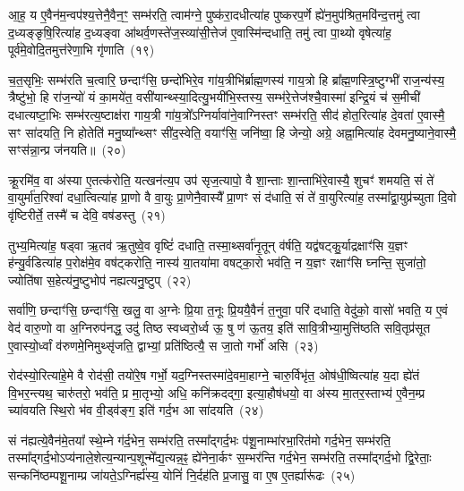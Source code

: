 आ॒ह॒ य ए॒वैन॑म॒न्वप॑श्य॒त्तेनै॒वैन॒ꣳ॒ सम्भ॑रति॒ त्वाम॑ग्ने॒ पुष्क॑रा॒दधीत्या॑ह पुष्करप॒र्णे ह्ये॑न॒मुप॑श्रित॒मवि॑न्द॒त्तमु॑ त्वा द॒ध्यङ्ङृषि॒रित्या॑ह द॒ध्यङ्वा आ॑थर्व॒णस्ते॑ज॒स्व्या॑सी॒त्तेज॑ ए॒वास्मि॑न्दधाति॒ तमु॑ त्वा पा॒थ्यो वृषेत्या॑ह॒ पूर्व॑मे॒वोदि॒तमुत्त॑रेणा॒भि गृ॑णाति~(१९)

च॒त॒सृभिः॒ सम्भ॑रति च॒त्वारि॒ छन्दाꣳ॑सि॒ छन्दो॑भिरे॒व गा॑य॒त्रीभि॑र्ब्राह्म॒णस्य॑ गाय॒त्रो हि ब्रा᳚ह्म॒णस्त्रि॒॒ष्टुग्भी॑ राज॒न्य॑स्य॒ त्रैष्टु॑भो॒ हि रा॑ज॒न्यो॑ यं का॒मये॑त॒ वसी॑यान्थ्स्या॒दित्यु॒भयी॑भि॒स्तस्य॒ सम्भ॑रे॒त्तेज॑श्चै॒वास्मा॑ इन्द्रि॒यं च॑ स॒मीची॑ दधात्यष्टा॒भिः सम्भ॑रत्य॒ष्टाक्ष॑रा गाय॒त्री गा॑य॒त्रो᳚\-ऽग्निर्यावा॑ने॒वाग्निस्तꣳ सम्भ॑रति॒ सीद॑ होत॒रित्या॑ह दे॒वता॑ ए॒वास्मै॒ सꣳ सा॑दयति॒ नि होतेति॑ मनु॒ष्या᳚न्थ्सꣳ सी॑द॒स्वेति॒ वयाꣳ॑सि॒ जनि॑ष्वा॒ हि जेन्यो॒ अग्रे॒ अह्ना॒मित्या॑ह देवमनु॒ष्याने॒वास्मै॒ सꣳस॑न्ना॒न्प्र ज॑नयति॥~(२०)

{\anuvakamend[{ऐव प॒शूनिति॑ गृणाति होत॒रिति॑ स॒प्तविꣳ॑शतिश्च}]}%

क्रू॒रमि॑व॒ वा अ॑स्या ए॒तत्क॑रोति॒ यत्खन॑त्य॒प उप॑ सृज॒त्यापो॒ वै शा॒न्ताः शा॒न्ताभि॑रे॒वास्यै॒ शुचꣳ॑ शमयति॒ सं ते॑ वा॒युर्मा॑त॒रिश्वा॑ दधा॒त्वित्या॑ह प्रा॒णो वै वा॒युः प्रा॒णेनै॒वास्यै᳚ प्रा॒णꣳ सं द॑धाति॒ सं ते॑ वा॒युरित्या॑ह॒ तस्मा᳚द्वा॒युप्र॑च्युता दि॒वो वृ॑ष्टिरीर्ते॒ तस्मै॑ च देवि॒ वष॑डस्तु~(२१)

तुभ्य॒मित्या॑ह॒ षड्वा ऋ॒तव॑ ऋ॒तुष्वे॒व वृष्टिं॑ दधाति॒ तस्मा॒थ्सर्वा॑नृ॒तून् व॑र्\mbox{}षति॒ यद्व॑षट्कु॒र्याद्रक्षाꣳ॑सि य॒ज्ञꣳ ह॑न्यु॒र्वडित्या॑ह प॒रोक्ष॑मे॒व वष॑ट्करोति॒ नास्य॑ या॒तया॑मा वषट्का॒रो भव॑ति॒ न य॒ज्ञꣳ रक्षाꣳ॑सि घ्नन्ति॒ सुजा॑तो॒ ज्योति॑षा स॒हेत्य॑नु॒ष्टुभोप॑ नह्यत्यनु॒ष्टुप्~(२२)

सर्वा॑णि॒ छन्दाꣳ॑सि॒ छन्दाꣳ॑सि॒ खलु॒ वा अ॒ग्नेः प्रि॒या त॒नूः प्रि॒ययै॒वैनं॑ त॒नुवा॒ परि॑ दधाति॒ वेदु॑को॒ वासो॑ भवति॒ य ए॒वं वेद॑ वारु॒णो वा अ॒ग्निरुप॑नद्ध॒ उदु॑ तिष्ठ स्वध्वरो॒र्ध्व ऊ॒ षु ण॑ ऊ॒तय॒ इति॑ सावि॒त्रीभ्या॒मुत्ति॑ष्ठति सवि॒तृप्र॑सूत ए॒वास्यो॒र्ध्वां व॑रुणमे॒निमुथ्सृ॑जति॒ द्वाभ्यां॒ प्रति॑ष्ठित्यै॒ स जा॒तो गर्भो॑ असि~(२३)

रोद॑स्यो॒रित्या॑हे॒मे वै रोद॑सी॒ तयो॑रे॒ष गर्भो॒ यद॒ग्निस्तस्मा॑दे॒वमा॒हाग्ने॒ चारु॒र्विभृ॑त॒ ओष॑धी॒ष्वित्या॑ह य॒दा ह्ये॑तं वि॒भर॒न्त्यथ॒ चारु॑तरो॒ भव॑ति॒ प्र मा॒तृभ्यो॒ अधि॒ कनि॑क्रदद्गा॒ इत्या॒हौष॑धयो॒ वा अ॑स्य मा॒तर॒स्ताभ्य॑ ए॒वैन॒म्प्र च्या॑वयति स्थि॒रो भ॑व वी॒ड्व॑ङ्ग॒ इति॑ गर्द॒भ आ सा॑दयति~(२४)

सं न॑ह्यत्ये॒वैन॑मे॒तया᳚ स्थे॒म्ने ग॑र्द॒भेन॒ सम्भ॑रति॒ तस्मा᳚द्गर्द॒भः प॑शू॒नाम्भा॑रभा॒रित॑मो गर्द॒भेन॒ सम्भ॑रति॒ तस्मा᳚द्गर्द॒भो\-ऽप्य॑नाले॒शेत्य॒न्यान्प॒शून्मे᳚द्य॒त्यन्न॒ꣴ॒ ह्ये॑नेना॒र्कꣳ स॒म्भर॑न्ति गर्द॒भेन॒ सम्भ॑रति॒ तस्मा᳚द्गर्द॒भो द्वि॒रेताः॒ सन्कनि॑ष्ठम्पशू॒नाम्प्र जा॑यते॒\-ऽग्निर्ह्य॑स्य॒ योनिं॑ नि॒र्दह॑ति प्र॒जासु॒ वा ए॒ष ए॒तर्\mbox{}ह्यारू॑ढः~(२५)

